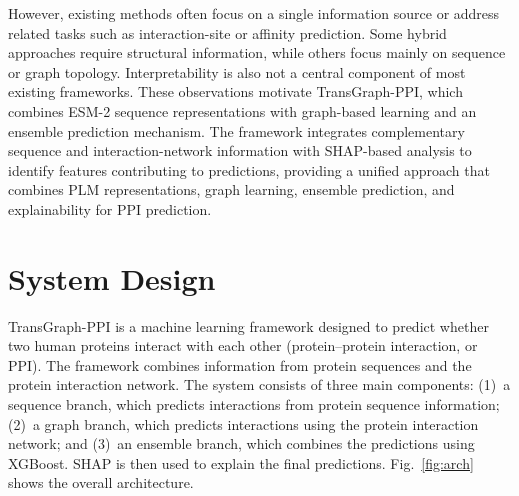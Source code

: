 \documentclass[conference]{IEEEtran}
\begin{document}
However, existing methods often focus on a single information source or
address related tasks such as interaction-site or affinity prediction. Some
hybrid approaches require structural information, while others focus mainly on
sequence or graph topology. Interpretability is also not a central component
of most existing frameworks. These observations motivate TransGraph-PPI, which
combines ESM-2 sequence representations with graph-based learning and an
ensemble prediction mechanism. The framework integrates complementary sequence
and interaction-network information with SHAP-based analysis to identify
features contributing to predictions, providing a unified approach that
combines PLM representations, graph learning, ensemble prediction, and
explainability for PPI prediction.

\section{System Design}\label{sec:design}
TransGraph-PPI is a machine learning framework designed to predict whether two
human proteins interact with each other (protein--protein interaction, or
PPI). The framework combines information from protein sequences and the protein
interaction network. The system consists of three main components:
(1)~a sequence branch, which predicts interactions from protein sequence
information; (2)~a graph branch, which predicts interactions using the protein
interaction network; and (3)~an ensemble branch, which combines the
predictions using XGBoost. SHAP is then used to explain the final predictions.
Fig.~\ref{fig:arch} shows the overall architecture.
\end{document}
